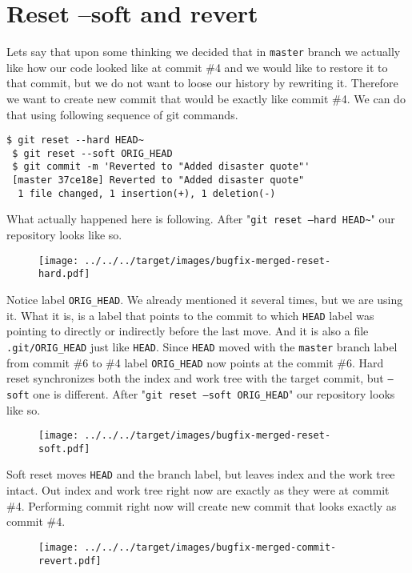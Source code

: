 \documentclass{article}
\theoremstyle{definition}
\begin{document}
        \section{Reset --soft and revert}
        Lets say that upon some thinking we decided that in \texttt{master} branch we actually like how our code looked
        like at commit \#4 and we would like to restore it to that commit, but we do not want to loose our history by
        rewriting it. Therefore we want to create new commit that would be exactly like commit \#4. We can do that using
        following sequence of git commands.
        \begin{Verbatim}[frame=single]
 $ git reset --hard HEAD~
 $ git reset --soft ORIG_HEAD
 $ git commit -m 'Reverted to "Added disaster quote"'
 [master 37ce18e] Reverted to "Added disaster quote"
  1 file changed, 1 insertion(+), 1 deletion(-)
        \end{Verbatim}
        What actually happened here is following. After "\texttt{git reset --hard HEAD\textasciitilde}" our repository
        looks like so.
        \begin{figure}[h]
        \centering\texttt{[image: ../../../target/images/bugfix-merged-reset-hard.pdf]}
        \caption{\label{fig:bugfix-merged-reset-hard}}
        \end{figure}

        \noindent Notice label \texttt{ORIG\_HEAD}. We already mentioned it several times, but we are using it. What it
        is, is a label that points to the commit to which \texttt{HEAD} label was pointing to directly or indirectly
        before the last move. And it is also a file \texttt{.git/ORIG\_HEAD} just like \texttt{HEAD}.
        Since \texttt{HEAD} moved with the \texttt{master} branch label from commit \#6 to \#4
        label \texttt{ORIG\_HEAD} now points at the commit \#6. Hard reset synchronizes both the index and work tree
        with the target commit, but \texttt{--soft} one is different.
        After "\texttt{git reset --soft ORIG\_HEAD}" our repository looks like so.
        \newpage
        \begin{figure}[h]
        \centering\texttt{[image: ../../../target/images/bugfix-merged-reset-soft.pdf]}
        \caption{\label{fig:bugfix-merged-reset-soft}}
        \end{figure}

        \noindent Soft reset moves \texttt{HEAD} and the branch label, but leaves index and the work tree intact. Out
        index and work tree right now are exactly as they were at commit \#4. Performing commit right now will create
        new commit that looks exactly as commit \#4.
        \begin{figure}[h]
        \centering\texttt{[image: ../../../target/images/bugfix-merged-commit-revert.pdf]}
        \caption{\label{fig:bugfix-merged-commit-revert}}
        \end{figure}
\end{document}
